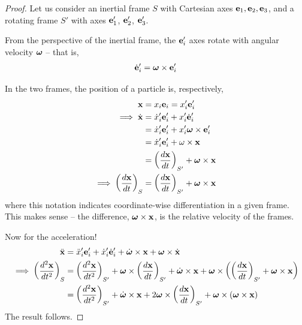 \documentclass{../template/note}
\begin{document}
    \begin{proof}
        Let us consider an inertial frame \(S\) with Cartesian axes \(\V e_1, \V e_2, \V e_3\), and a rotating frame \(S'\) with axes \(\V e_1'\), \(\V e_2'\), \(\V e_3'\). 

        From the perspective of the inertial frame, the \(\V e_i'\) axes rotate with angular velocity \(\V \omega\) -- that is,
        \begin{align*}
            \dot{\V e}_i' = \V \omega \times \V e_i'
        \end{align*}

        In the two frames, the position of a particle is, respectively,
        \begin{align*}
            \V x &= x_i \V e_i = x_i' \V e_i' \\
            \implies \dot{\V x} &=  \dot x_i' \V e'_i + x_i' \dot{\V e}_i' \\
            &= \dot x_i' \V e'_i + x_i' \V \omega \times \V e_i' \\
            &= \dot x_i' \V e'_i + \omega \times \V x \\
            &= \left(\frac{d\V x}{dt}\right)_{S'} + \V \omega \times \V x \\
            \implies \left(\frac{d\V x}{dt}\right)_S &= \left(\frac{d\V x}{dt}\right)_{S'} + \V \omega \times \V x
        \end{align*}
        where this notation indicates coordinate-wise differentiation in a given frame. This makes sense -- the difference, \(\V \omega \times \V x\), is the relative velocity of the frames.

        Now for the acceleration!
        \begin{align*}
            \ddot{\V x} &= \ddot x_i' \V e_i' + \dot x_i' \dot{\V e}_i' + \dot{\V \omega} \times \V x + \V \omega \times \dot{\V x} \\
            \implies \left(\frac{d^2\V x}{dt^2}\right)_S &= \left(\frac{d^2\V x}{dt^2}\right)_{S'} + \V \omega \times \left(\frac{d\V x}{dt}\right)_{S'} + \dot{\V \omega} \times \V x + \V \omega \times \left(\left(\frac{d\V x}{dt}\right)_{S'}+\V \omega \times \V x\right) \\
            &= \left(\frac{d^2\V x}{dt^2}\right)_{S'} + \dot{\V \omega} \times \V x + 2 \V \omega \times \left(\frac{d\V x}{dt}\right)_{S'} + \V \omega \times (\V \omega \times \V x)
        \end{align*}
        The result follows.
    \end{proof}
    
\end{document}
